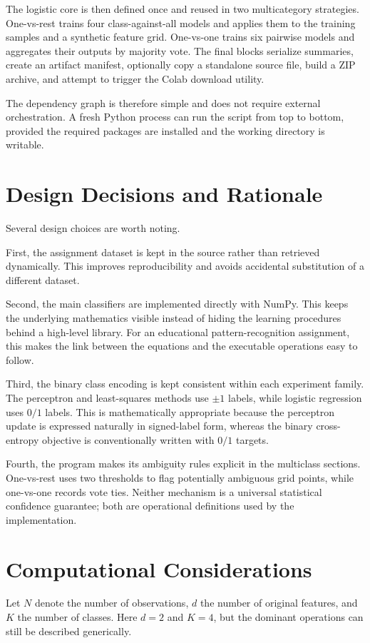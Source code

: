 \documentclass[11pt,a4paper]{article}
\begin{document}
The logistic core is then defined once and reused in two multicategory strategies. One-vs-rest trains four class-against-all models and applies them to the training samples and a synthetic feature grid. One-vs-one trains six pairwise models and aggregates their outputs by majority vote. The final blocks serialize summaries, create an artifact manifest, optionally copy a standalone source file, build a ZIP archive, and attempt to trigger the Colab download utility.

The dependency graph is therefore simple and does not require external orchestration. A fresh Python process can run the script from top to bottom, provided the required packages are installed and the working directory is writable.

\section{Design Decisions and Rationale}
Several design choices are worth noting.

First, the assignment dataset is kept in the source rather than retrieved dynamically. This improves reproducibility and avoids accidental substitution of a different dataset.

Second, the main classifiers are implemented directly with NumPy. This keeps the underlying mathematics visible instead of hiding the learning procedures behind a high-level library. For an educational pattern-recognition assignment, this makes the link between the equations and the executable operations easy to follow.

Third, the binary class encoding is kept consistent within each experiment family. The perceptron and least-squares methods use \(\pm1\) labels, while logistic regression uses \(0/1\) labels. This is mathematically appropriate because the perceptron update is expressed naturally in signed-label form, whereas the binary cross-entropy objective is conventionally written with \(0/1\) targets.

Fourth, the program makes its ambiguity rules explicit in the multiclass sections. One-vs-rest uses two thresholds to flag potentially ambiguous grid points, while one-vs-one records vote ties. Neither mechanism is a universal statistical confidence guarantee; both are operational definitions used by the implementation.

\section{Computational Considerations}
Let \(N\) denote the number of observations, \(d\) the number of original features, and \(K\) the number of classes. Here \(d=2\) and \(K=4\), but the dominant operations can still be described generically.
\end{document}
